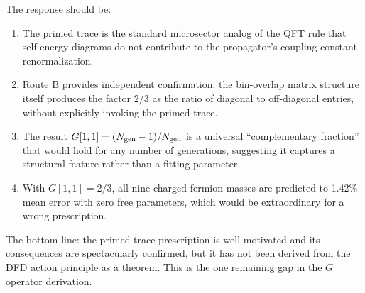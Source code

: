 \documentclass[11pt]{article}
\theoremstyle{definition}
\begin{document}
The response should be:
\begin{enumerate}
\item The primed trace is the standard microsector analog of the QFT rule that self-energy
diagrams do not contribute to the propagator's coupling-constant renormalization.
\item Route B provides independent confirmation: the bin-overlap matrix structure itself
produces the factor $2/3$ as the ratio of diagonal to off-diagonal entries, without
explicitly invoking the primed trace.
\item The result $G[1,1] = (N_{\rm gen} - 1)/N_{\rm gen}$ is a universal
``complementary fraction'' that would hold for any number of generations, suggesting
it captures a structural feature rather than a fitting parameter.
\item With $G[1,1] = 2/3$, all nine charged fermion masses are predicted to 1.42\% mean error
with zero free parameters, which would be extraordinary for a wrong prescription.
\end{enumerate}

The bottom line: the primed trace prescription is well-motivated and its consequences
are spectacularly confirmed, but it has not been derived from the DFD action principle
as a theorem. This is the one remaining gap in the $G$ operator derivation.
\end{document}
